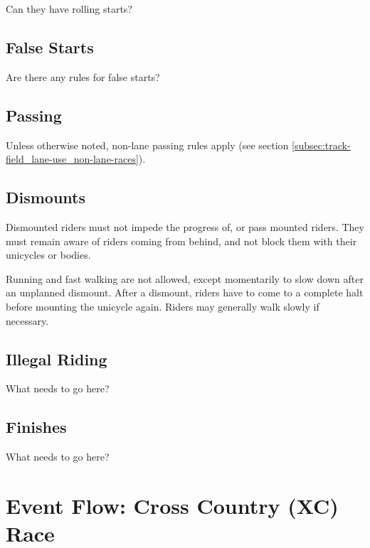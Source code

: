 \begin{framed}
Can they have rolling starts?
\end{framed}

\subsection{False Starts}

\begin{framed}
Are there any rules for false starts?
\end{framed}

\subsection{Passing}

Unless otherwise noted, non-lane passing rules apply (see section \ref{subsec:track-field_lane-use_non-lane-races}).

\subsection{Dismounts}

Dismounted riders must not impede the progress of, or pass mounted riders.
They must remain aware of riders coming from behind, and not block them with their
unicycles or bodies.

Running and fast walking are not allowed, except momentarily to slow down after an unplanned dismount.
After a dismount, riders have to come to a complete halt before mounting the unicycle again.
Riders may generally walk slowly if necessary.

\subsection{Illegal Riding}

\begin{framed}
What needs to go here?
\end{framed}

\subsection{Finishes}

\begin{framed}
What needs to go here?
\end{framed}

\section{Event Flow: Cross Country (XC) Race\label{sec:muni_xc}}

